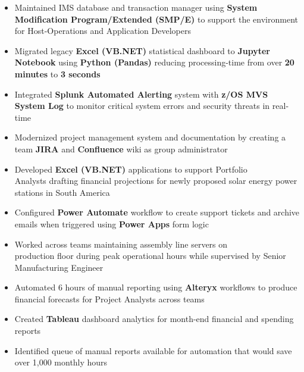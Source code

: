 \documentclass[10pt,a4paper,ragged2e,withhyper]{altacv}
\begin{document}
    \begin{paracol}{2}

        \begin{itemize}
            \item Maintained IMS database and transaction manager using \textbf{ System Modification Program/Extended (SMP/E)} to support the environment for Host-Operations and Application Developers
            \item Migrated legacy \textbf{Excel (VB.NET)} statistical dashboard to \textbf{Jupyter Notebook} using \textbf{Python (Pandas)} reducing processing-time from over \textbf{20 minutes} to \textbf{3 seconds}
            \item Integrated \textbf{Splunk Automated Alerting } system with \textbf{z/OS MVS System Log} to monitor critical system errors and security threats in real-time
            \item Modernized project management system and documentation by creating a team \textbf{JIRA} and \textbf{Confluence} wiki as group administrator
        \end{itemize}

        \medskip

        \begin{itemize}
            \item Developed \textbf{Excel (VB.NET)} applications to support Portfolio\\ Analysts drafting financial projections for newly proposed solar energy power stations in South America
            \item Configured \textbf{Power Automate} workflow to create support tickets and archive emails when triggered using \textbf{Power Apps} form logic  
            \item Worked across teams maintaining assembly line servers on\\ production floor during peak operational hours while supervised by Senior Manufacturing Engineer
        \end{itemize}
        
        \medskip
        
        \begin{itemize}
            \item Automated 6 hours of manual reporting using \textbf{Alteryx} workflows to produce financial forecasts for Project Analysts across teams
            \item Created \textbf{Tableau} dashboard analytics for month-end financial and spending reports
            \item Identified queue of manual reports available for automation that would save over 1,000 monthly hours
        \end{itemize}
        

\end{paracol}
\end{document}
